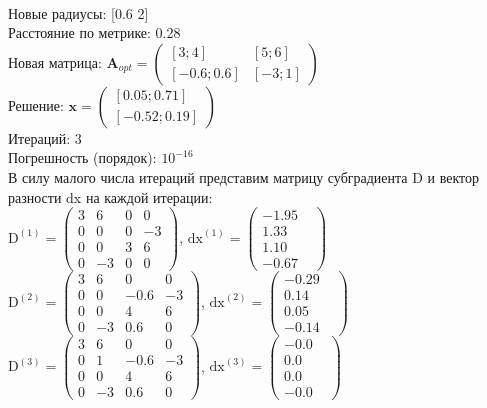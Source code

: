\documentclass[../body.tex]{subfiles}
\begin{document}
\\Новые радиусы: [0.6 2]
\\Расстояние по метрике: 0.28
\\Новая матрица: $\textbf{A}_{opt} = \begin{pmatrix}
        [3;4]& [5;6]\\
        [-0.6;0.6]& [-3;1]
        \end{pmatrix}$
\\Решение: $\textbf{x} = \begin{pmatrix}
        [0.05;0.71]\\
        [-0.52;0.19]
        \end{pmatrix}$
\\Итераций: 3
\\Погрешность (порядок): $10^{-16}$
\\В силу малого числа итераций представим матрицу субградиента D и вектор разности dx на каждой итерации:
\\$\textrm{D}^{(1)} = \begin{pmatrix}
        3& 6& 0& 0\\
        0& 0& 0& -3\\
        0& 0& 3& 6\\
        0& -3& 0& 0
        \end{pmatrix}$, $\textrm{dx}^{(1)} = \begin{pmatrix}
        -1.95&\\
        1.33&\\
        1.10&\\
        -0.67&
        \end{pmatrix}$
\\$\textrm{D}^{(2)} = \begin{pmatrix}
        3& 6& 0& 0\\
        0& 0& -0.6& -3\\
        0& 0& 4& 6\\
        0& -3& 0.6& 0
        \end{pmatrix}$, $\textrm{dx}^{(2)} = \begin{pmatrix}
        -0.29&\\
        0.14&\\
        0.05&\\
        -0.14&
        \end{pmatrix}$
\\$\textrm{D}^{(3)} = \begin{pmatrix}
        3& 6& 0& 0\\
        0& 1& -0.6& -3\\
        0& 0& 4& 6\\
        0& -3& 0.6& 0
        \end{pmatrix}$, $\textrm{dx}^{(3)} = \begin{pmatrix}
        -0.0&\\
        0.0&\\
        0.0&\\
        -0.0&
        \end{pmatrix}$
\end{document}

